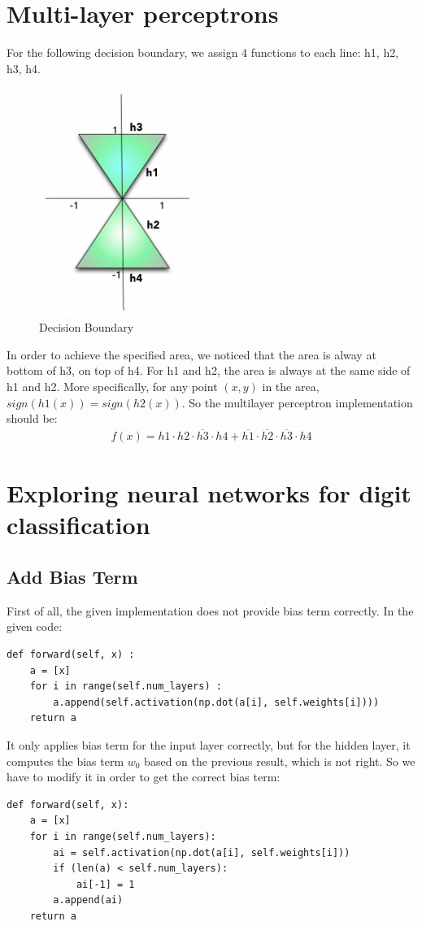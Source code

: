 \documentclass{article}
\begin{document}
\section{Multi-layer perceptrons}
For the following decision boundary, we assign 4 functions to each line: h1, h2, h3, h4.
\begin{figure}[H]
	\centering
	\includegraphics[width = 2in]{figure/boundary.png}
	\caption{Decision Boundary}
\end{figure}
In order to achieve the specified area, we noticed that the area is alway at bottom of h3, on top of h4. For h1 and h2, the area is always at the same side of h1 and h2. More specifically, for any point $(x, y)$ in the area, $sign(h1(x))=sign(h2(x))$. So the multilayer perceptron implementation should be:
\begin{align}
f(x)=h1\cdot h2\cdot \overline{h3}\cdot h4+\overline{h1}\cdot \overline{h2}\cdot\overline{h3}\cdot h4
\end{align}
\section{Exploring neural networks for digit classification}
\subsection{Add Bias Term}
First of all, the given implementation does not provide bias term correctly. In the given code:
\begin{lstlisting}
def forward(self, x) :
    a = [x]
    for i in range(self.num_layers) :
	    a.append(self.activation(np.dot(a[i], self.weights[i])))
    return a
\end{lstlisting}
It only applies bias term for the input layer correctly, but for the hidden layer, it computes the bias term $w_{0}$ based on the previous result, which is not right. So we have to modify it in order to get the correct bias term:
\begin{lstlisting}
def forward(self, x):
    a = [x]
    for i in range(self.num_layers):
	    ai = self.activation(np.dot(a[i], self.weights[i]))
	    if (len(a) < self.num_layers):
		    ai[-1] = 1
		a.append(ai)
    return a
\end{lstlisting}
\end{document}
